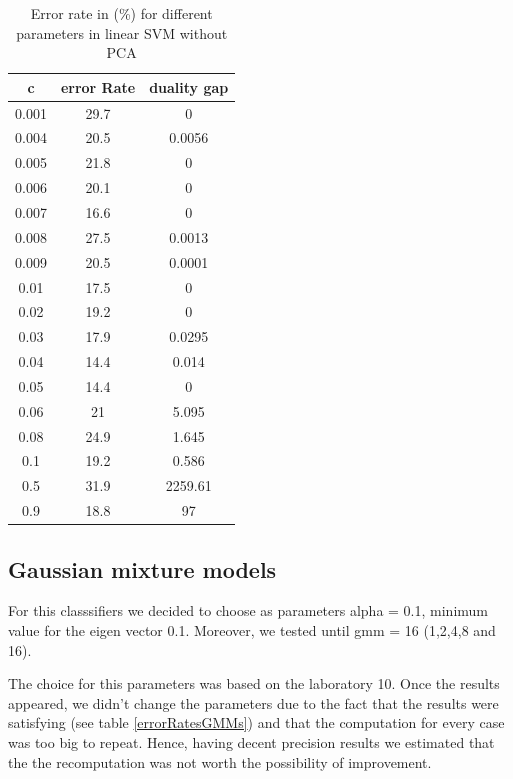 \documentclass[twoside,a4paper,12pt]{report}
\begin{document}
\begin{table}[H]
    \centering
     \begin{tabular}{||c c c ||} 
        \hline \hline
            c& error Rate& duality gap \\
            \hline \hline
            0.001&29.7& 0 \\
            \hline
            0.004&20.5& 0.0056\\
            \hline
            0.005& 21.8& 0\\
            \hline
            0.006& 20.1& 0\\
            \hline
            0.007& 16.6& 0\\
            \hline
            0.008& 27.5& 0.0013\\
            \hline
            0.009& 20.5& 0.0001\\
            \hline
            0.01& 17.5& 0\\
            \hline
            0.02&19.2& 0\\
            \hline
            0.03& 17.9& 0.0295\\
            \hline
            0.04& \cellcolor{blue!25}14.4& 0.014\\
            \hline
            0.05& \cellcolor{blue!25}14.4& 0\\
            \hline
            0.06& 21& 5.095\\
            \hline
            0.08& 24.9& 1.645\\
            \hline
            0.1& 19.2& 0.586\\
            \hline
            0.5& 31.9& 2259.61\\
            \hline
            0.9& 18.8& 97\\
\hline \hline
    \end{tabular}
    \caption{Error rate in (\%) for different parameters in linear SVM without PCA \label{errorRatesLinearSVMNoPCA}}
\end{table}    






\subsection{Gaussian mixture models}
For this classsifiers we decided to choose as parameters alpha = 0.1, minimum value
for the eigen vector 0.1. Moreover, we tested until gmm = 16 (1,2,4,8 and 16).

The choice for this parameters was based on the laboratory 10. Once the results appeared,
we didn't change the parameters due to the fact that the results were satisfying (see table \ref{errorRatesGMMs})
and that the computation for every case was too big to repeat. Hence, having
decent precision results we estimated that the the recomputation was not worth the 
possibility of improvement.
\end{document}
